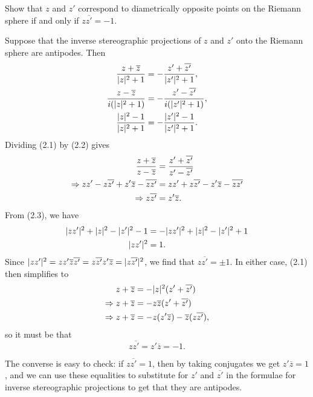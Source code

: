 \begin{exercise}
	Show that $z$ and $z'$ correspond to diametrically opposite points on the Riemann sphere if and only if $z\overline{z'}=-1$.
	
	\begin{sol}
		Suppose that the inverse stereographic projections of $z$ and $z'$ onto the Riemann sphere are antipodes. Then
		\begin{align}
			\dfrac{z+\overline{z}}{\lvert z \rvert^2+1} &=-\dfrac{z'+\overline{z'}}{\lvert z' \rvert^2+1}, \\
			\dfrac{z-\overline{z}}{i(\lvert z \rvert^2+1)} &=-\dfrac{z'-\overline{z'}}{i(\lvert z' \rvert^2+1)}, \\
			\dfrac{\lvert z \rvert^2-1}{\lvert z \rvert^2+1} &=-\dfrac{\lvert z' \rvert^2-1}{\lvert z' \rvert^2+1}.
		\end{align}
		Dividing (2.1) by (2.2) gives 
		\begin{align*}
			\dfrac{z+\overline{z}}{z-\overline{z}} &=\dfrac{z'+\overline{z'}}{z'-\overline{z'}} \\
			\Rightarrow zz'-z\overline{z'}+z'\overline{z}-\overline{zz'} &=zz'+z\overline{z'}-z'\overline{z}-\overline{zz'} \\
			\Rightarrow z\overline{z'} &=z'\overline{z}.
		\end{align*}
		From (2.3), we have
		\begin{align*}
			\lvert zz' \rvert^2+\lvert z \rvert^2-\lvert z' \rvert^2-1 &=-\lvert zz' \rvert^2+\lvert z \rvert^2-\lvert z' \rvert^2+1 \\
			\lvert zz' \rvert^2 &=1.
		\end{align*}
		Since $\lvert zz' \rvert^2=zz'\overline{z}\overline{z'}=z\overline{z'}z'\overline{z}=\lvert z\overline{z'} \rvert^2$, we find that $z\overline{z'}=\pm 1$. In either case, (2.1) then simplifies to
		\begin{align*}
			z+\overline{z} &=-\lvert z \rvert^2(z'+\overline{z'}) \\
			\Rightarrow z+\overline{z} &=-z\overline{z}(z'+\overline{z'}) \\
			\Rightarrow z+\overline{z} &=-z(z'\overline{z})-\overline{z}(z\overline{z'}),
		\end{align*}
		so it must be that $$z\overline{z'}=z'\overline{z}=-1.$$
		
		The converse is easy to check: if $z\overline{z'}=1$, then by taking conjugates we get $z'\overline{z}=1$, and we can use these equalities to substitute for $z'$ and $\overline{z'}$ in the formulae for inverse stereographic projections to get that they are antipodes.
	\end{sol}
\end{exercise}

